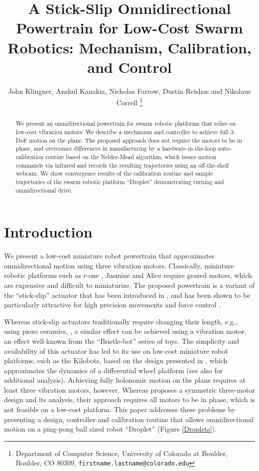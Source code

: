 \documentclass[letterpaper, 10pt, conference]{ieeeconf}
\title{\LARGE \bf
A Stick-Slip Omnidirectional Powertrain for Low-Cost Swarm Robotics: Mechanism, Calibration, and Control
}
\author{John Klingner, Anshul Kanakia, Nicholas Farrow, Dustin Reishus and Nikolaus Correll%
\thanks{Department of Computer Science,
University of Colorado at Boulder,
 Boulder, CO 80309,
{\tt\small firstname.lastname{@}colorado.edu}}%
}
\begin{document}
\maketitle


\begin{abstract}
We present an omnidirectional powertrain for swarm robotic platforms that relies on low-cost vibration motors. We describe a mechanism and controller to achieve full 3-DoF motion on the plane. The proposed approach does not require the motors to be in phase, and overcomes differences in manufacturing by a hardware-in-the-loop auto-calibration routine based on the Nelder-Mead algorithm, which issues motion commands via infrared and records the resulting trajectories using an off-the-shelf webcam. We show convergence results of the calibration routine and sample trajectories of the swarm robotic platform ``Droplet'' demonstrating turning and omnidirectional drive.   
\end{abstract}


\section{Introduction}
We present a low-cost miniature robot powertrain that approximates omnidirectional motion using three vibration motors. Classically, miniature robotic platforms such as r-one \cite{mclurkin2013low}, Jasmine \cite{jasmine} and Alice \cite{alice} require geared motors, which are expensive and difficult to miniaturize. The proposed powertrain is a variant of the ``stick-slip'' actuator that has been introduced in \cite{breguet1998stick}, and has been shown to be particularly attractive for high precision movements \cite{brufau2005micron,chu2006novel,martel2001three,martel2005fundamental,eigoli2012locomotion} and force control \cite{vartholomeos2008analysis}.   

Whereas stick-slip actuators traditionally require changing their length, e.g., using piezo ceramics,  \cite{breguet1998stick, martel2005fundamental}, a similar effect can be achieved using a vibration motor, an effect well-known from the ``Bristle-bot'' series of toys. The simplicity and availability of this actuator  has led to its use on low-cost miniature robot platforms, such as the Kilobots, \cite{rubenstein2012kilobot} based on the design presented in \cite{Vartholomeos2006}, which approximates the dynamics of a differential wheel platform (see also \cite{spartali2013speed} for additional analysis). Achieving fully holonomic motion on the plane requires at least three vibration motors, however. Whereas \cite{Vartholomeos2005} proposes a symmetric three-motor design and its analysis, their approach requires all motors to be in phase, which is not feasible on a low-cost platform. This paper addresses these problems by presenting a design, controller and calibration routine that allows omnidirectional motion on a ping-pong ball sized robot ``Droplet'' (Figure \ref{Droplets}).
\end{document}

